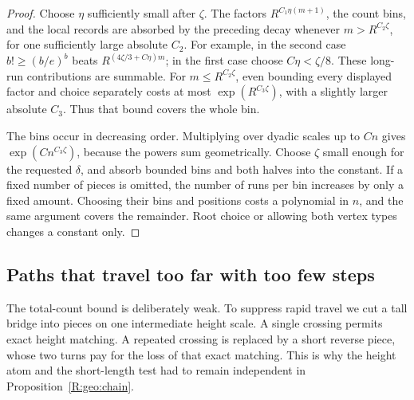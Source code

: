 \begin{proof}
Choose $\eta$ sufficiently small after $\zeta$.  The factors
$R^{C_1\eta(m+1)}$, the count bins, and the local records are absorbed
by the preceding decay whenever $m>R^{C_2\zeta}$, for one sufficiently
large absolute $C_2$.  For example, in the second case
$b!\ge(b/e)^b$ beats $R^{(4\zeta/3+C\eta)m}$; in the first case
choose $C\eta<\zeta/8$.  These long-run contributions are summable.
For $m\le R^{C_2\zeta}$, even bounding every displayed factor and
choice separately costs at most $\exp(R^{C_3\zeta})$, with a slightly
larger absolute $C_3$.  Thus that bound covers the whole bin.

The bins occur in decreasing order.  Multiplying over dyadic scales
up to $Cn$ gives $\exp(Cn^{C_3\zeta})$, because the powers sum
geometrically.  Choose $\zeta$ small enough for the requested
$\delta$, and absorb bounded bins and both halves into the constant.
If a fixed number of pieces is omitted, the number of runs per bin
increases by only a fixed amount.  Choosing their bins and positions
costs a polynomial in $n$, and the same argument covers the remainder.
Root choice or allowing both vertex types changes a constant only.
\end{proof}

\subsection{Paths that travel too far with too few steps}

The total-count bound is deliberately weak.  To suppress rapid travel we
cut a tall bridge into pieces on one intermediate height scale.  A
single crossing permits exact height matching.  A repeated crossing is
replaced by a short reverse piece, whose two turns pay for the loss of
that exact matching.  This is why the height atom and the short-length
test had to remain independent in Proposition~\ref{R:geo:chain}.

